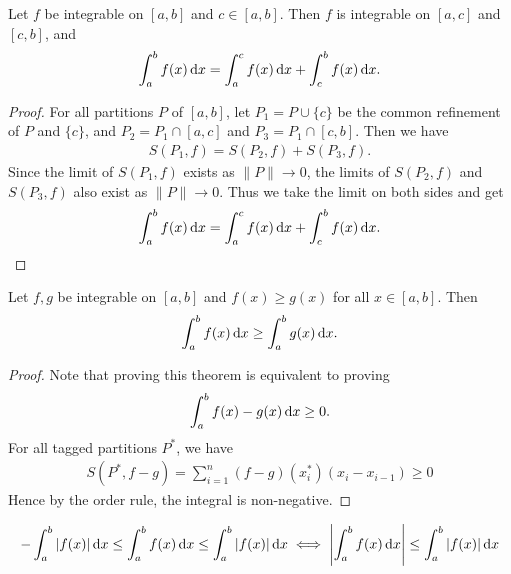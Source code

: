 \begin{theorem}
    Let $f$ be integrable on $[a,b]$ and $c\in[a,b]$. Then $f$ is integrable on $[a,c]$ and $[c,b]$, and
    \begin{align*}
        \int_{a}^{b} f(x) \operatorname*{d\!} x = \int_{a}^{c} f(x) \operatorname*{d\!} x + \int_{c}^{b} f(x) \operatorname*{d\!} x.
    \end{align*}
\end{theorem}
\begin{proof}
    For all partitions $P$ of $[a,b]$, let $P_1 = P \cup \{c\}$ be the common refinement of $P$ and $\{c\}$, and $P_2 = P_1 \cap [a,c]$ and $P_3 = P_1 \cap [c,b]$. Then we have
    \begin{align*}
        S(P_1,f) = S(P_2,f) + S(P_3,f).
    \end{align*}
    Since the limit of $S(P_1,f)$ exists as $\|P\|\to 0$, the limits of $S(P_2,f)$ and $S(P_3,f)$ also exist as $\|P\|\to 0$. Thus we take the limit on both sides and get 
    \begin{align*}
        \int_{a}^{b} f(x) \operatorname*{d\!} x = \int_{a}^{c} f(x) \operatorname*{d\!} x + \int_{c}^{b} f(x) \operatorname*{d\!} x.
    \end{align*}
\end{proof}

\begin{theorem}
    Let $f,g$ be integrable on $[a,b]$ and $f(x) \ge g(x)$ for all $x\in[a,b]$. Then
    \begin{align*}
        \int_a^b f(x) \operatorname*{d\!} x \ge \int_a^b g(x) \operatorname*{d\!} x.
    \end{align*}
\end{theorem}
\begin{proof}
    Note that proving this theorem is equivalent to proving
    \begin{align*}
        \int_{a}^{b} f(x) - g(x) \operatorname*{d\!} x \ge 0.
    \end{align*}
    For all tagged partitions $P^*$, we have
    \begin{align*}
        S(P^*, f-g) = \sum_{i=1}^{n} (f-g)(x^*_i)(x_i - x_{i-1}) \ge 0
    \end{align*}
    Hence by the order rule, the integral is non-negative.
\end{proof}

\begin{corollary}
    \begin{align*}
        -\int_{a}^{b} \left|f(x)\right| \operatorname*{d\!} x \le \int_{a}^{b} f(x) \operatorname*{d\!} x \le \int_{a}^{b} \left|f(x)\right| \operatorname*{d\!} x \iff \left|\int_{a}^{b} f(x) \operatorname*{d\!} x\right| \le \int_{a}^{b} \left|f(x)\right| \operatorname*{d\!} x
    \end{align*}
\end{corollary}


